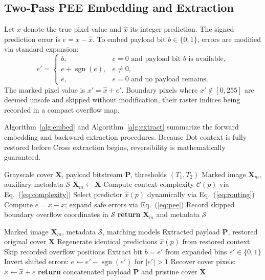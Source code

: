 \documentclass[conference]{IEEEtran}
\begin{document}
\subsection{Two-Pass PEE Embedding and Extraction}
Let $x$ denote the true pixel value and $\hat{x}$ its integer prediction. The signed prediction error is $e = x - \hat{x}$. To embed payload bit $b \in \{0, 1\}$, errors are modified via standard expansion:
\begin{equation}
e' = 
\begin{cases}
b, & e = 0 \text{ and payload bit } b \text{ is available}, \\
e + \operatorname{sgn}(e), & e \ne 0, \\
e, & e = 0 \text{ and no payload remains}.
\end{cases}
\label{eq:pee}
\end{equation}
The marked pixel value is $x' = \hat{x} + e'$. Boundary pixels where $x' \notin [0, 255]$ are deemed unsafe and skipped without modification, their raster indices being recorded in a compact overflow map.

Algorithm~\ref{alg:embed} and Algorithm~\ref{alg:extract} summarize the forward embedding and backward extraction procedures. Because Dot context is fully restored before Cross extraction begins, reversibility is mathematically guaranteed.

\begin{algorithm}[!t]
\caption{Two-Pass PEE Embedding}
\label{alg:embed}
\begin{algorithmic}[1]
\Require Grayscale cover $\mathbf{X}$, payload bitstream $\mathbf{P}$, thresholds $(T_1, T_2)$
\Ensure Marked image $\mathbf{X}_m$, auxiliary metadata $\mathcal{S}$
\State $\mathbf{X}_m \gets \mathbf{X}$
    \State Compute context complexity $\mathcal{C}(p)$ via Eq.~(\ref{eq:complexity})
    \State Select predictor $\hat{x}(p)$ dynamically via Eq.~(\ref{eq:routing})
    \State Compute $e = x - \hat{x}$; expand safe errors via Eq.~(\ref{eq:pee})
    \State Record skipped boundary overflow coordinates in $\mathcal{S}$
\EndFor
\State \textbf{return} $\mathbf{X}_m$ and metadata $\mathcal{S}$
\end{algorithmic}
\end{algorithm}

\begin{algorithm}[!t]
\caption{Reverse-Order Extraction and Cover Recovery}
\label{alg:extract}
\begin{algorithmic}[1]
\Require Marked image $\mathbf{X}_m$, metadata $\mathcal{S}$, matching models
\Ensure Extracted payload $\mathbf{P}$, restored original cover $\mathbf{X}$
    \State Regenerate identical predictions $\hat{x}(p)$ from restored context
    \State Skip recorded overflow positions
    \State Extract bit $b = e'$ from expanded bins $e' \in \{0, 1\}$
    \State Invert shifted errors: $e \gets e' - \operatorname{sgn}(e')$ for $|e'| > 1$
    \State Recover cover pixels: $x \gets \hat{x} + e$
\EndFor
\State \textbf{return} concatenated payload $\mathbf{P}$ and pristine cover $\mathbf{X}$
\end{algorithmic}
\end{algorithm}
\end{document}
